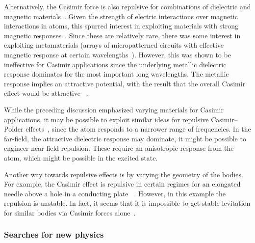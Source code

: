 Alternatively, the Casimir force is also repulsive for combinations of dielectric and magnetic materials~\cite{Boyer1974}.  
Given the strength of electric interactions over magnetic interactions in atoms, this spurred interest
in exploiting materials with strong magnetic responses~\cite{Kenneth2002}.  
Since these are relatively rare, there was some interest in exploiting metamaterials (arrays of micropatterned circuits with
effective magnetic response at certain wavelengths~\cite{Pendry1999}).  However, this was shown to be ineffective
for Casimir applications since the underlying metallic dielectric response dominates for the most important long wavelengths.
The metallic response implies an attractive potential, with the result that the overall Casimir effect would be attractive~
\cite{Ianuzzi2003comment,Rosa2008,Pirozhenko2008,Yannopapas2009}.  

While the preceding discussion emphasized varying materials for Casimir applications, it may 
be possible to exploit similar ideas for repulsive Casimir--Polder effects~\cite{Milton2011,Milton2012},
since the atom responds to a narrower range of frequencies.  In the far-field, the attractive dielectric
response may dominate, it might be possible to engineer near-field repulsion.  
These require an anisotropic response from the atom, which might be possible in the excited state.

Another way towards repulsive effects is by varying the geometry of the bodies.  
For example, the Casimir effect is repulsive in certain regimes for an elongated needle above a hole in a conducting plate~
\cite{Levin2010,Rodriguez2013}.  However, in this example the repulsion is unstable. 
In fact, it seems that it is impossible to get stable levitation for similar bodies via Casimir forces alone~\cite{Rahi2010}.

\subsubsection{Searches for new physics}

